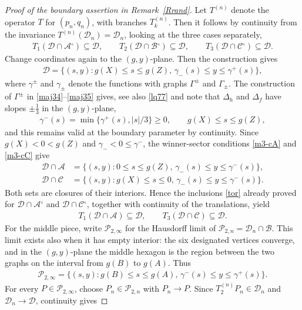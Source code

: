 \documentclass[11pt,reqno,tbtags,a4paper]{amsart}
\numberwithin{equation}{section}
\renewcommand\le{\leq}
\renewcommand\ge{\geq}
\renewcommand\leq{\leqslant}
\renewcommand\geq{\geqslant}
\theoremstyle{plain}%
\theoremstyle{definition}
\theoremstyle{remark}
\newcounter{cases}
\newcommand{\refR}[1]{Remark~\ref{#1}}
\newcommand\inter{\ensuremath{^\circ}}
\newcommand\gD{\Delta}
\newcommand\gG{\Gamma}
\newcommand\cA{\mathcal A}
\newcommand\cB{\mathcal B}
\newcommand\cC{\mathcal C}
\newcommand\cD{\mathcal D}
\newcommand\cP{\mathcal P}
\newcommand\Tn{T^{(n)}}
\newcommand\0{{\boldsymbol 0}}
\newcommand\1{{\boldsymbol 1}}
\begin{document}
\begin{proof}[Proof of the boundary assertion in \refR{Rrand}]
Let $\Tn$ denote the operator $T$ for $(p_n,q_n)$, with branches $T_k^{(n)}$.
Then it follows by continuity from the invariance $\Tn(\cD_n)=\cD_n$,
looking at the three cases separately,
\begin{align}\label{tor}
 T_1(\cD\cap\cA\inter)\subseteq\cD,\qquad
 T_2(\cD\cap\cB\inter)\subseteq\cD,\qquad
 T_3(\cD\cap\cC\inter)\subseteq\cD.
\end{align}
%
Change coordinates again to the $(g,y)$-plane. Then the construction gives
\begin{align}
\cD=\bigl\{(s,y):g(X)\le s\le g(Z),\,
 \gamma_-(s)\le y\le\gamma^+(s)\bigr\},
\end{align}
where $\gamma^\pm$ and $\gamma_\pm$ denote the functions with graphs
$\gG^\pm$ and $\gG_\pm$.
The construction of $\gG^\pm$ in \eqref{maj34}--\eqref{maj35}
gives, see also \eqref{lq77} and note that $\gD_h$ and $\gD_f$ have slopes
$\pm\frac13$ in the $(g,y)$-plane,
\begin{align}\label{vidar}
\gamma^-(s)=\min\{\gamma^+(s),|s|/3\}\ge0,
\qquad g(X)\le s\le g(Z),
%
\end{align}
and this remains valid at the boundary parameter by continuity.
Since $g(X)<0<g(Z)$ and $\gamma_-<0\le\gamma^-$, the winner-sector
conditions \eqref{m3-cA} and \eqref{m3-cC} give
\begin{align}
\cD\cap\cA
&=\bigl\{(s,y):0\le s\le g(Z),\,
\gamma_-(s)\le y\le\gamma^-(s)\bigr\},\\
\cD\cap\cC
&=\bigl\{(s,y):g(X)\le s\le0,\,
        \gamma_-(s)\le y\le\gamma^-(s)\bigr\}.
\end{align}
Both sets are closures of their interiors. Hence the inclusions \eqref{tor} 
already
proved for $\cD\cap\cA\inter$ and $\cD\cap\cC\inter$, together with
continuity of the translations, yield
\begin{align}
T_1(\cD\cap\cA)\subseteq\cD,
\qquad
T_3(\cD\cap\cC)\subseteq\cD.
\end{align}
For the middle piece, write $\cP_{2,\infty}$ for the Hausdorff limit of
$\cP_{2,n}=\cD_n\cap\cB$.
This limit exists also when it has empty interior: the six designated
vertices converge, and in the $(g,y)$-plane the middle hexagon is the
region between the two graphs on the interval from $g(B)$ to $g(A)$.
Thus
\begin{align}
\cP_{2,\infty}
=\bigl\{(s,y):g(B)\le s\le g(A),\,
         \gamma^-(s)\le y\le\gamma^+(s)\bigr\}.
\end{align}
For every $P\in\cP_{2,\infty}$, choose $P_n\in\cP_{2,n}$ with $P_n\to P$.
Since $T_2^{(n)}P_n\in\cD_n$ and $\cD_n\to\cD$, continuity gives

\end{proof}
\end{document}
